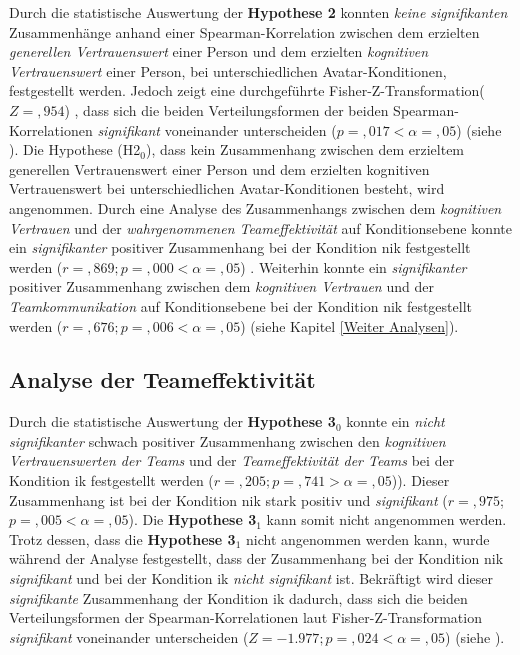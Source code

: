 \documentclass[a4paper,11pt]{article}%
\renewcommand{\\}{\vspace*{0.5\baselineskip} \newline}
\begin{document}
{Durch die statistische Auswertung der \textbf{Hypothese 2} konnten \textit{keine signifikanten} Zusammenhänge anhand einer Spearman-Korrelation zwischen dem erzielten \textit{generellen Vertrauenswert} einer Person und dem erzielten \textit{kognitiven Vertrauenswert} einer Person, bei unterschiedlichen Avatar-Konditionen, festgestellt werden. Jedoch zeigt eine durchgeführte Fisher-Z-Transformation($Z =,954$) , dass sich die beiden Verteilungsformen der beiden Spearman-Korrelationen \textit{signifikant} voneinander unterscheiden ($p =,017 < \alpha =,05$) (siehe ).\\
Die Hypothese (H2$_{0}$), dass kein Zusammenhang zwischen dem erzieltem generellen Vertrauenswert einer Person und dem erzielten kognitiven Vertrauenswert bei unterschiedlichen Avatar-Konditionen besteht, wird angenommen.\\
Durch eine Analyse des Zusammenhangs zwischen dem \textit{kognitiven Vertrauen} und der \textit{wahrgenommenen Teameffektivität} auf Konditionsebene konnte ein \textit{signifikanter} positiver Zusammenhang bei der Kondition \ac{nik} festgestellt werden ($r =,869; p =,000 < \alpha = ,05$) .
Weiterhin konnte ein \textit{signifikanter} positiver Zusammenhang zwischen dem \textit{kognitiven Vertrauen} und der \textit{Teamkommunikation} auf Konditionsebene bei der Kondition \ac{nik} festgestellt werden ($r =,676; p =,006 < \alpha = ,05$) (siehe Kapitel \ref{Weiter Analysen}).

\subsection{Analyse der Teameffektivität}
\label{AnalyseTE}
Durch die statistische Auswertung der \textbf{Hypothese 3$_{0}$} konnte ein \textit{nicht signifikanter} schwach positiver Zusammenhang zwischen den \textit{kognitiven Vertrauenswerten der Teams} und der \textit{Teameffektivität der Teams} bei der Kondition \ac{ik} festgestellt werden ($r=,205 ;p =,741 > \alpha = ,05$)). Dieser Zusammenhang ist bei der Kondition \ac{nik} stark positiv und \textit{signifikant} ($r=,975$; $p =,005 < \alpha = ,05$). Die \textbf{Hypothese 3$_{1}$} kann somit nicht angenommen werden.\newline
Trotz dessen, dass die \textbf{Hypothese 3$_{1}$} nicht angenommen werden kann, wurde während der Analyse festgestellt, dass der Zusammenhang bei der Kondition \ac{nik} \textit{signifikant} und bei der Kondition \ac{ik} \textit{nicht signifikant} ist. Bekräftigt wird dieser \textit{signifikante} Zusammenhang der Kondition \ac{ik} dadurch, dass sich die beiden Verteilungsformen der Spearman-Korrelationen laut Fisher-Z-Transformation \textit{signifikant} voneinander unterscheiden ($Z=-1.977 ;p =,024 < \alpha = ,05$) (siehe ).\newpage

}
\end{document}
